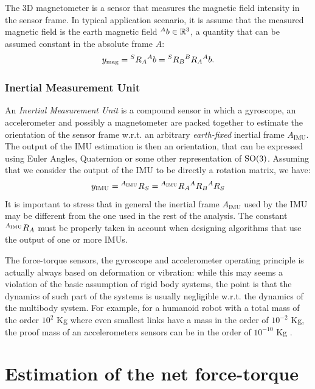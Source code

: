 The 3D magnetometer is a sensor that measures the magnetic field intensity in the sensor frame. In typical application scenario, it is assume that the measured magnetic field is the earth magnetic field $\hspace{0em}^A b \in \mathbb{R}^3$, a quantity that can be assumed constant in the absolute frame $A$:
\begin{equation}
y_{\text{mag}} = \hspace{0em}^S R_A \hspace{0em}^A b = \hspace{0em}^S R_B \hspace{0em}^B R_A \hspace{0em}^A b .
\end{equation}

\subsubsection{Inertial Measurement Unit}

An \emph{Inertial Measurement Unit} is a compound sensor in which a gyroscope, an accelerometer and possibly a magnetometer are packed together to estimate the orientation of the sensor frame w.r.t. an arbitrary \emph{earth-fixed} inertial frame $A_{\text{IMU}}$. The output of the IMU estimation is then an orientation, that can be expressed using Euler Angles, Quaternion or some other representation of $\textrm{SO}(3)$. Assuming that we consider the output of the IMU to be directly a rotation matrix, we have:
\begin{equation}
y_{\text{IMU}} = \hspace{0em}^{A_{\text{IMU}}} R_S = \hspace{0em}^{A_{\text{IMU}}} R_A \hspace{0em}^A R_B \hspace{0em}^A R_S
\end{equation}
It is important to stress that in general the inertial frame $A_{\text{IMU}}$ used by the IMU may be different from the one used in the rest of the analysis. The constant $\hspace{0em}^{A_{\text{IMU}}} R_A$ must be properly taken in account when designing algorithms that use the output of one or more IMUs.

\begin{remark}
The force-torque sensors, the gyroscope and accelerometer operating principle is actually always based on deformation or vibration: while this may seems a violation of the basic assumption of rigid body systems, the point is that the dynamics of such part of the systems is usually negligible w.r.t. the dynamics of the multibody system. 
For example, for a humanoid robot with a total mass of the order $10^2$ \si{Kg} where even smallest links have a mass in the order of $10^{-2}$ \si{Kg}, the proof mass of an accelerometers sensors can be in the order of $10^{-10}$ \si{Kg} \citep{andrejavsic2008mems}.
\end{remark}


\section{Estimation of the net force-torque}
\label{sec:net-force-torque-estimation}

